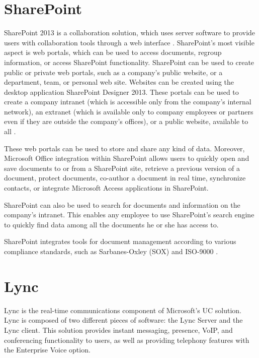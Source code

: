 \section{SharePoint}

SharePoint 2013 is a collaboration solution, which uses server software to provide users with collaboration tools through a web interface
\cite[Ch. 1]{husman_beginning_2010}.
SharePoint's most visible aspect is web portals, which can be used to access documents, regroup information, or access SharePoint functionality.
SharePoint can be used to create public or private web portals, such as a company's public website, or a department, team, or personal web site. Websites can be created using the desktop application SharePoint Designer 2013.
These portals can be used to create a company intranet (which is accessible only from the company's internal network), an extranet (which is available only to company employees or partners even if they are outside the company's offices), or a public website, available to all
\cite[Ch. 1]{husman_beginning_2010}.


These web portals can be used to store and share any kind of data. Moreover, Microsoft Office integration within SharePoint allows users to quickly open and save documents to or from a SharePoint site, retrieve a previous version of a document, protect documents, co-author a document in real time, synchronize contacts, or integrate Microsoft Access applications in SharePoint.

SharePoint can also be used to search for documents and information on the company's intranet. This enables any employee to use SharePoint's search engine to quickly find data among all the documents he or she has access to.

SharePoint integrates tools for document management according to various compliance standards, such as Sarbanes-Oxley (SOX) and ISO-9000
\cite[Ch. 1]{husman_beginning_2010}.



\section{Lync}

Lync is the real-time communications component of Microsoft's UC solution. Lync is composed of two different pieces of software: the Lync Server and the Lync client. This solution provides instant messaging, presence, VoIP, and conferencing functionality to users, as well as providing telephony features with the Enterprise Voice option\cite{winters_mastering_2012}.

